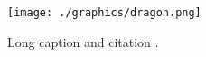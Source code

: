 \begin{figure}[H]
	\centering

	\texttt{[image: ./graphics/dragon.png]}
	
	\caption[Short caption.]{Long caption and citation \cite{whittle15_dragons}.}
	
	\label{fig:dragon}
\end{figure}